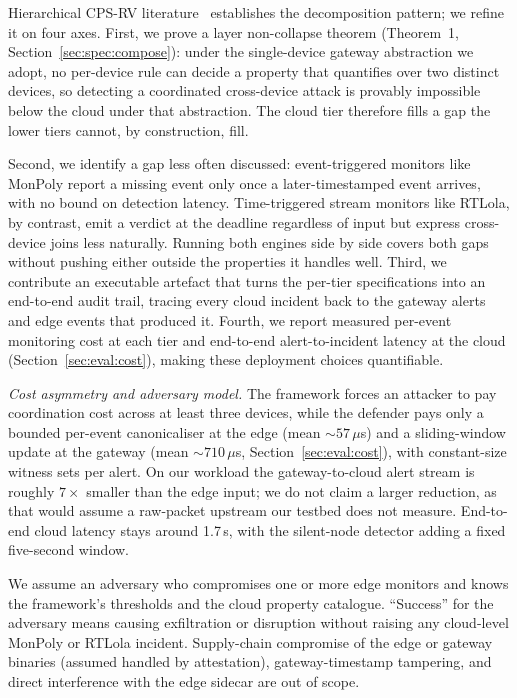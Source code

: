 \documentclass[runningheads]{llncs}
\begin{document}
Hierarchical CPS-RV
literature~\cite{strel2017,sastl2020} establishes the
decomposition pattern; we refine it on four axes.  First,
we prove a layer non-collapse theorem (Theorem~1,
Section~\ref{sec:spec:compose}): under the single-device gateway
abstraction we adopt, no per-device rule can decide a property that
quantifies over two distinct devices, so detecting a coordinated
cross-device attack is provably impossible below the cloud under that
abstraction.  The
cloud tier therefore fills a gap the lower tiers cannot, by
construction, fill.



Second, we identify a gap less often discussed:
event-triggered monitors like MonPoly report a missing event only
once a later-timestamped event arrives, with no bound on detection
latency.  Time-triggered stream monitors like RTLola, by contrast,
emit a verdict at the deadline regardless of input but express
cross-device joins less naturally.  Running both engines side by side covers both
gaps without pushing either outside the properties it handles well.
Third, we contribute an executable artefact that turns the
per-tier specifications into an end-to-end audit trail, tracing every
cloud incident back to the gateway alerts and edge events that
produced it.  Fourth, we report measured per-event monitoring
cost at each tier and end-to-end alert-to-incident latency at the
cloud (Section~\ref{sec:eval:cost}), making these deployment choices
quantifiable.

\emph{Cost asymmetry and adversary model.}  The framework forces an attacker to pay coordination cost across
at least three devices, while the defender pays only a bounded
per-event canonicaliser at the edge (mean ${\sim}57\,\mu$s) and a
sliding-window update at the gateway (mean ${\sim}710\,\mu$s,
Section~\ref{sec:eval:cost}), with constant-size witness sets per
alert.  On our workload the gateway-to-cloud alert stream is
roughly $7\times$ smaller than the edge input; we do not claim a larger
reduction, as that would assume a raw-packet upstream our testbed
does not measure.  End-to-end cloud latency stays around 1.7\,s,
with the silent-node detector adding a fixed five-second window.

We assume an adversary who compromises one or more edge
monitors and knows the framework's thresholds and the cloud
property catalogue.  ``Success'' for the adversary means causing
exfiltration or disruption without raising any cloud-level MonPoly
or RTLola incident.  Supply-chain compromise of the
edge or gateway binaries (assumed handled by attestation),
gateway-timestamp tampering, and direct interference with the
edge sidecar are out of scope.
\end{document}
